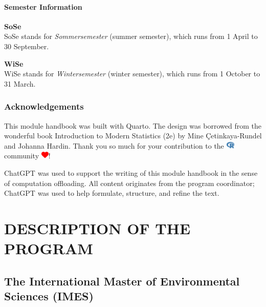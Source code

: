 \documentclass[
  letterpaper,
  10pt,
  openany]{book}
\begin{document}
\subsection*{Semester Information}\label{semester-information}

\textbf{SoSe}\\
SoSe stands for \emph{Sommersemester} (summer semester), which runs from
1 April to 30 September.

\textbf{WiSe}\\
WiSe stands for \emph{Wintersemester} (winter semester), which runs from
1 October to 31 March.

\section*{Acknowledgements}\label{acknowledgements}


This module handbook was built with Quarto. The design was borrowed from
the wonderful book Introduction to Modern Statistics (2e) by Mine
Çetinkaya-Rundel and Johanna Hardin. Thank you so much for your
contribution to the
\includegraphics[width=1.13em,height=1em]{index_files/figure-pdf/fa-icon-9b00320707d42527dde67262afb33ded.pdf}
community
\includegraphics[width=1em,height=1em]{index_files/figure-pdf/fa-icon-6b1c619c48de1f5403657f48089c1ea3.pdf}!

ChatGPT was used to support the writing of this module handbook in the
sense of computation offloading. All content originates from the program
coordinator; ChatGPT was used to help formulate, structure, and refine
the text.

\part{DESCRIPTION OF THE PROGRAM}

\chapter*{The International Master of Environmental Sciences
(IMES)}\label{the-international-master-of-environmental-sciences-imes}
\end{document}
